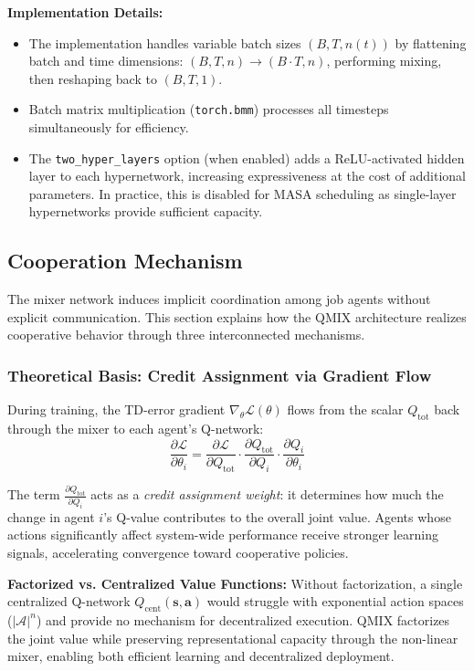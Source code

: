 \textbf{Implementation Details:}
\begin{itemize}
\item The implementation handles variable batch sizes \((B, T, n(t))\) by flattening batch and time dimensions: \((B, T, n) \rightarrow (B \cdot T, n)\), performing mixing, then reshaping back to \((B, T, 1)\).
\item Batch matrix multiplication (\texttt{torch.bmm}) processes all timesteps simultaneously for efficiency.
\item The \texttt{two\_hyper\_layers} option (when enabled) adds a ReLU-activated hidden layer to each hypernetwork, increasing expressiveness at the cost of additional parameters. In practice, this is disabled for MASA scheduling as single-layer hypernetworks provide sufficient capacity.
\end{itemize}

\subsection{Cooperation Mechanism}
\label{sec:cooperation}

The mixer network induces implicit coordination among job agents without explicit communication. This section explains how the QMIX architecture realizes cooperative behavior through three interconnected mechanisms.

\subsubsection{Theoretical Basis: Credit Assignment via Gradient Flow}

During training, the TD-error gradient \(\nabla_\theta \mathcal{L}(\theta)\) flows from the scalar \(Q_{\text{tot}}\) back through the mixer to each agent's Q-network:
\[
\frac{\partial \mathcal{L}}{\partial \theta_i} = \frac{\partial \mathcal{L}}{\partial Q_{\text{tot}}} \cdot \frac{\partial Q_{\text{tot}}}{\partial Q_i} \cdot \frac{\partial Q_i}{\partial \theta_i}
\]

The term \(\frac{\partial Q_{\text{tot}}}{\partial Q_i}\) acts as a \textit{credit assignment weight}: it determines how much the change in agent \(i\)'s Q-value contributes to the overall joint value. Agents whose actions significantly affect system-wide performance receive stronger learning signals, accelerating convergence toward cooperative policies.

\textbf{Factorized vs. Centralized Value Functions:} Without factorization, a single centralized Q-network \(Q_{\text{cent}}(\mathbf{s}, \mathbf{a})\) would struggle with exponential action spaces (\(|\mathcal{A}|^n\)) and provide no mechanism for decentralized execution. QMIX factorizes the joint value while preserving representational capacity through the non-linear mixer, enabling both efficient learning and decentralized deployment.


